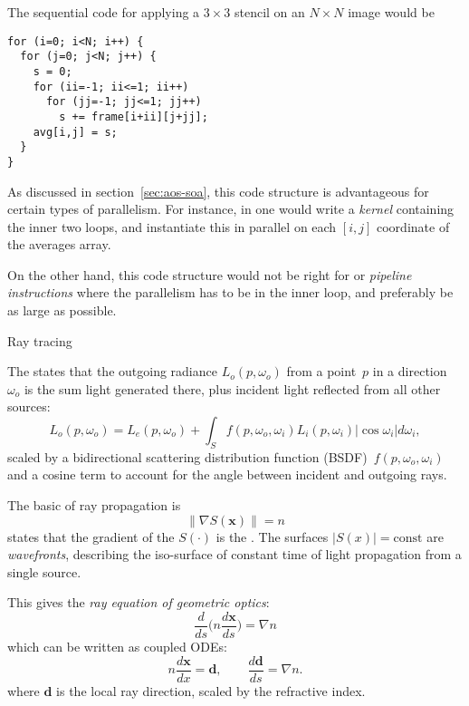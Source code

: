 The sequential code for applying a $3\times 3$ stencil
on an $N\times N$ image
would be
\begin{verbatim}
for (i=0; i<N; i++) {
  for (j=0; j<N; j++) {
    s = 0;
    for (ii=-1; ii<=1; ii++)
      for (jj=-1; jj<=1; jj++)
        s += frame[i+ii][j+jj];
    avg[i,j] = s;
  }
}
\end{verbatim}

As discussed in section~\ref{sec:aos-soa}, this code structure
is advantageous for certain types of parallelism. For instance,
in  one would write a \emph{kernel}
containing the inner two loops, and instantiate this
in parallel on each $[i,j]$ coordinate of the averages array.

On the other hand, this code structure would not be right for
 or \emph{pipeline
  instructions} where the parallelism has
to be in the inner loop, and preferably be as large as possible.

 {Ray tracing}

The  states that the outgoing
radiance $L_o(p,\omega_o)$ from a point~$p$ in a direction~$\omega_o$
is the sum light generated there, plus incident light reflected from all other
sources:
\[ L_o(p,\omega_o) = L_e(p,\omega_o)
   + \int_S f(p,\omega_o,\omega_i) L_i(p,\omega_i) \left|\cos \omega_i\right| 
   d\omega_i,
\]
scaled by a 
bidirectional scattering distribution function (BSDF)~$f(p,\omega_o,\omega_i)$
and a cosine term to account for the angle between incident and
outgoing rays.

The basic  of ray propagation is
\begin{equation}
  \| \nabla S(\mathbf x) \| = n
  \label{eq:ekonal}
\end{equation}
states that the gradient of the  $S(\cdot)$ is
the . The surfaces
$|S(x)|=\mathrm{const}$ are
\emph{wavefronts},
describing the iso-surface of constant time of light propagation from
a single source.

This gives the \emph{ray equation of geometric optics}:
\begin{equation}
  \frac{d}{ds}\bigl( n\frac{d\mathbf x}{ds} \bigr)
  = \nabla n
\end{equation}
which can be written as coupled \acp{ODE}:
\begin{equation}
  n\frac{d\mathbf{x}}{dx}=\mathbf{d}, \qquad
  \frac{d\mathbf{d}}{ds} = \nabla n.
\end{equation}
where $\mathbf{d}$ is the local ray direction, scaled by the
refractive index.


